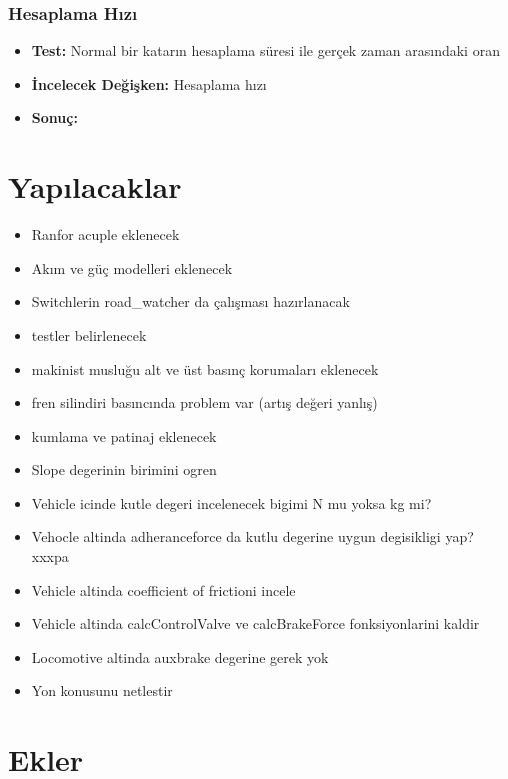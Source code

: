 \documentclass[10pt,a4paper]{article}
\begin{document}
\subsubsection{Hesaplama Hızı}
\begin{itemize}
\item \textbf{Test:} Normal bir katarın hesaplama süresi ile gerçek zaman arasındaki oran\\
\item \textbf{İncelecek Değişken:} Hesaplama hızı\\
\item \textbf{Sonuç:}
\end{itemize}

\newpage
\section{Yapılacaklar}
\begin{itemize}
\item Ranfor acuple eklenecek
\item Akım ve güç modelleri eklenecek
\item Switchlerin road\_watcher da çalışması hazırlanacak
\item testler belirlenecek
\item makinist musluğu alt ve üst basınç korumaları eklenecek
\item fren silindiri basıncında problem var (artış değeri yanlış)
\item kumlama ve patinaj eklenecek
\item Slope degerinin birimini ogren
\item Vehicle icinde kutle degeri incelenecek bigimi N mu yoksa kg mi?
\item Vehocle altinda adheranceforce da kutlu degerine uygun degisikligi yap? xxxpa
\item Vehicle altinda coefficient of frictioni incele
\item Vehicle altinda calcControlValve ve calcBrakeForce fonksiyonlarini kaldir
\item Locomotive altinda auxbrake degerine gerek yok
\item Yon konusunu netlestir
\end{itemize}


\newpage
\section{Ekler}
\end{document}
